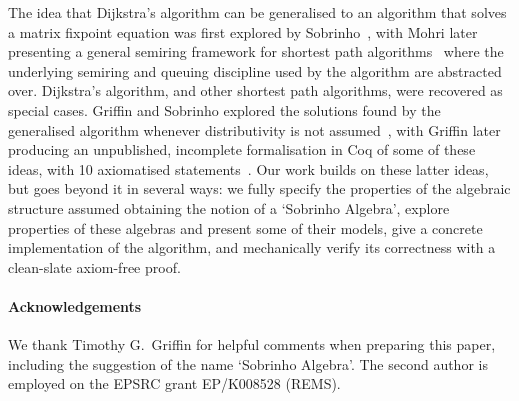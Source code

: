 The idea that Dijkstra's algorithm can be generalised to an algorithm that solves a matrix fixpoint equation was first explored by Sobrinho~\cite{sobrinho_algebra_2001}, with Mohri later presenting a general semiring framework for shortest path algorithms~\cite{mohri:semiring:2002} where the underlying semiring and queuing discipline used by the algorithm are abstracted over.
Dijkstra's algorithm, and other shortest path algorithms, were recovered as special cases.
Griffin and Sobrinho explored the solutions found by the generalised algorithm whenever distributivity is not assumed~\cite{sobrinho_routing_2010}, with Griffin later producing an unpublished, incomplete formalisation in Coq of some of these ideas, with 10 axiomatised statements~\cite{griffin:equilibrium-coq}.
Our work builds on these latter ideas, but goes beyond it in several ways: we fully specify the properties of the algebraic structure assumed obtaining the notion of a `Sobrinho Algebra', explore properties of these algebras and present some of their models, give a concrete implementation of the algorithm, and mechanically verify its correctness with a clean-slate axiom-free proof.

\paragraph{Acknowledgements} We thank Timothy G.~Griffin for helpful comments when preparing this paper, including the suggestion of the name `Sobrinho Algebra'.
The second author is employed on the EPSRC grant EP/K008528 (REMS).
